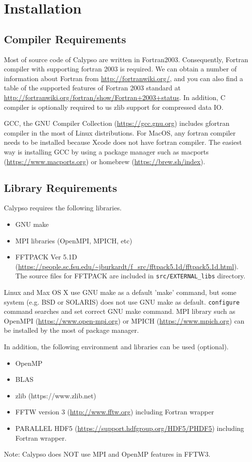 \newpage
\section{Installation}


\subsection{Compiler Requirements}
Most of source code of Calypso are written in Fortran2003. Consequently, Fortran compiler with supporting fortran 2003 is required. We can obtain a number of information about Fortran from \url{http://fortranwiki.org/}, and you can also find a table of the supported features of Fortran 2003 standard at \url{http://fortranwiki.org/fortran/show/Fortran+2003+status}. In addition, C compiler is optionally required to us zlib support for compressed data IO. 

GCC, the GNU Compiler Collection (\url{https://gcc.gnu.org}) includes gfortran compiler in the most of Linux distributions. For MacOS, any fortran compiler needs to be installed because Xcode does not have fortran compiler. The easiest way is installing GCC by using a package manager such as macports (\url{https://www.macports.org}) or homebrew (\url{https://brew.sh/index}).


\subsection{Library Requirements}
\label{sec:requirements}
Calypso requires the following libraries.
\begin{itemize}
\item GNU make
\item MPI libraries (OpenMPI, MPICH, etc)
\item FFTPACK Ver 5.1D (\url{https://people.sc.fsu.edu/~jburkardt/f_src/fftpack5.1d/fftpack5.1d.html}). The source files for FFTPACK are included in {\tt src/EXTERNAL\_libs} directory.
\end{itemize}
Linux and Max OS X use GNU make as a default 'make' command, but some system (e.g. BSD or SOLARIS) does not use GNU make as default. \verb|configure| command searches and set correct GNU make command. MPI library such as OpenMPI (\url{https://www.open-mpi.org}) or MPICH (\url{https://www.mpich.org}) can be installed by the most of package manager.

In addition, the following environment and libraries can be used (optional).
\begin{itemize}
\item OpenMP 
\item BLAS
\item zlib (https://www.zlib.net)
\item FFTW version 3 (\url{http://www.fftw.org}) including Fortran wrapper
\item PARALLEL HDF5 (\url{https://support.hdfgroup.org/HDF5/PHDF5})  including Fortran wrapper.
\end{itemize}
Note: Calypso does NOT use MPI and OpenMP features in FFTW3. 

